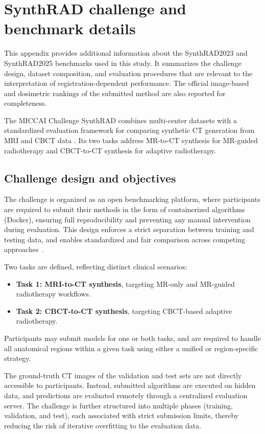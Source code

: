 \documentclass[lettersize,journal]{IEEEtran}
\begin{document}
\section{SynthRAD challenge and benchmark details}
\label{app:synthrad}

This appendix provides additional information about the SynthRAD2023 and SynthRAD2025 benchmarks used in this study. It summarizes the
challenge design, dataset composition, and evaluation procedures that are relevant to the interpretation of registration-dependent
performance. The official image-based and dosimetric rankings of the submitted method are also reported for completeness.

The MICCAI Challenge SynthRAD combines multi-center datasets with a standardized evaluation framework for comparing synthetic CT generation from MRI and CBCT data \cite{thummerer2025synthrad2025,huijben2024generating}. Its two tasks address MR-to-CT synthesis for MR-guided radiotherapy and CBCT-to-CT synthesis for adaptive radiotherapy.

\subsection{Challenge design and objectives}

The challenge is organized as an open benchmarking platform, where participants are required to submit their methods in the form of containerized algorithms (Docker), ensuring full reproducibility and preventing any manual intervention during evaluation. 
This design enforces a strict separation between training and testing data, and enables standardized and fair comparison across competing approaches~\cite{thummerer2025synthrad2025}.

Two tasks are defined, reflecting distinct clinical scenarios:
\begin{itemize}
    \item \textbf{Task 1: MRI-to-CT synthesis}, targeting MR-only and MR-guided radiotherapy workflows.
    \item \textbf{Task 2: CBCT-to-CT synthesis}, targeting CBCT-based adaptive radiotherapy.
\end{itemize}

Participants may submit models for one or both tasks, and are required to handle all anatomical regions within a given task using either a unified or region-specific strategy.

The ground-truth CT images of the validation and test sets are not directly accessible to participants. 
Instead, submitted algorithms are executed on hidden data, and predictions are evaluated remotely through a centralized evaluation server. 
The challenge is further structured into multiple phases (training, validation, and test), each associated with strict submission limits, thereby reducing the risk of iterative overfitting to the evaluation data.
\end{document}
